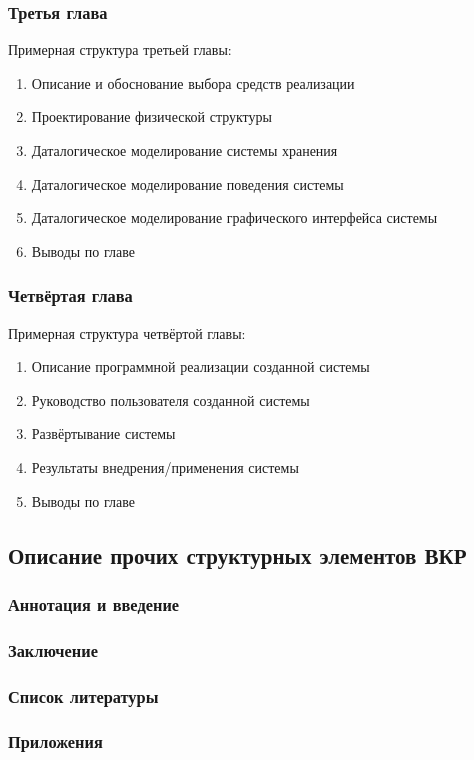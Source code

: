 \subsubsection{Третья глава}

Примерная структура третьей главы:
\begin{enumerate} [
	label=2.\arabic*.,
	labelwidth=\widthof{0.0.},
	itemindent=\the\labelwidth+\the\labelsep]
	\item Описание и обоснование выбора средств реализации
	\item Проектирование физической структуры
	\item Даталогическое моделирование системы хранения
	\item Даталогическое моделирование поведения системы
	\item Даталогическое моделирование графического интерфейса системы
	\item Выводы по главе		
\end{enumerate}

\subsubsection{Четвёртая глава}

Примерная структура четвёртой главы:
\begin{enumerate} [	label=4.\arabic*.]
	\item Описание программной реализации созданной системы
	\item Руководство пользователя созданной системы
	\item Развёртывание системы
	\item Результаты внедрения/применения системы
	\item Выводы по главе		
\end{enumerate}




\subsection{Описание прочих структурных элементов ВКР}

\subsubsection{Аннотация и  введение}

\subsubsection{Заключение}

\subsubsection{Список литературы}

\subsubsection{Приложения}